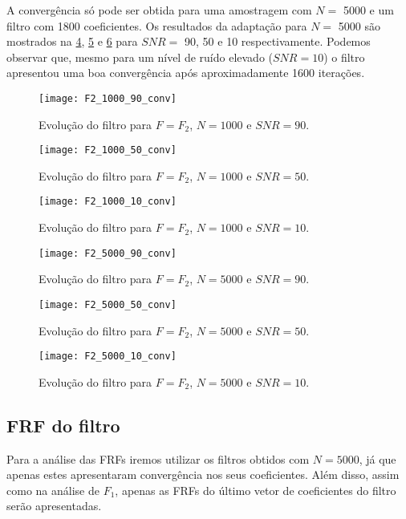 A convergência só pode ser obtida para uma amostragem com $ N= $ 5000 e um filtro com 1800 coeficientes. Os resultados da adaptação para $ N= $ 5000 são mostrados na \cref{fig:F2_5000_90_conv}, \cref{fig:F2_5000_50_conv} e \cref{fig:F2_5000_10_conv} para $ SNR = $ 90, 50 e 10  respectivamente. Podemos observar que, mesmo para um nível de ruído elevado ($ SNR=10 $) o filtro apresentou uma boa convergência após aproximadamente 1600 iterações.

\begin{figure}[h]
	\centering
	\texttt{[image: F2\_1000\_90\_conv]}
	\caption{Evolução do filtro para $ F=F_2 $, $ N=1000 $ e $ SNR=90 $.}
	\label{fig:F2_1000_90_conv}
\end{figure}

\begin{figure}
	\centering
	\texttt{[image: F2\_1000\_50\_conv]}
	\caption{Evolução do filtro para $ F=F_2 $, $ N=1000 $ e $ SNR=50 $.}
	\label{fig:F2_1000_50_conv}
\end{figure}

\begin{figure}
	\centering
	\texttt{[image: F2\_1000\_10\_conv]}
	\caption{Evolução do filtro para $ F=F_2 $, $ N=1000 $ e $ SNR=10 $.}
	\label{fig:F2_1000_10_conv}
\end{figure}

\begin{figure}
	\centering
	\texttt{[image: F2\_5000\_90\_conv]}
	\caption{Evolução do filtro para $ F=F_2 $, $ N=5000 $ e $ SNR=90 $.}
	\label{fig:F2_5000_90_conv}
\end{figure}

\begin{figure}
	\centering
	\texttt{[image: F2\_5000\_50\_conv]}
	\caption{Evolução do filtro para $ F=F_2 $, $ N=5000 $ e $ SNR=50 $.}
	\label{fig:F2_5000_50_conv}
\end{figure}

\begin{figure}
	\centering
	\texttt{[image: F2\_5000\_10\_conv]}
	\caption{Evolução do filtro para $ F=F_2 $, $ N=5000 $ e $ SNR=10 $.}
	\label{fig:F2_5000_10_conv}
\end{figure}

\subsection{FRF do filtro}
Para a análise das FRFs iremos utilizar os filtros obtidos com $ N=5000 $, já que apenas estes apresentaram convergência nos seus coeficientes. Além disso, assim como na análise de $ F_1 $, apenas as FRFs do último vetor de coeficientes do filtro serão apresentadas.

